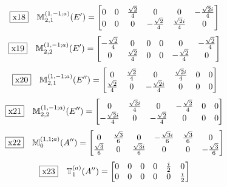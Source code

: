 \documentclass[fleqn,10pt,landscape]{jsarticle}
\begin{document}
\begin{dmath*}
\fbox{x18}\quad \mathbb{M}_{2,1}^{(1,-1;a)}(E^{\prime})=\begin{bmatrix} 0 & 0 & \frac{\sqrt{2}}{4} & 0 & 0 & - \frac{\sqrt{2} i}{4} \\ 0 & 0 & 0 & - \frac{\sqrt{2}}{4} & \frac{\sqrt{2} i}{4} & 0 \end{bmatrix}
\end{dmath*}
\begin{dmath*}
\fbox{x19}\quad \mathbb{M}_{2,2}^{(1,-1;a)}(E^{\prime})=\begin{bmatrix} - \frac{\sqrt{2}}{4} & 0 & 0 & 0 & 0 & - \frac{\sqrt{2}}{4} \\ 0 & \frac{\sqrt{2}}{4} & 0 & 0 & - \frac{\sqrt{2}}{4} & 0 \end{bmatrix}
\end{dmath*}
\begin{dmath*}
\fbox{x20}\quad \mathbb{M}_{2,1}^{(1,-1;a)}(E^{\prime\prime})=\begin{bmatrix} 0 & \frac{\sqrt{2}}{4} & 0 & \frac{\sqrt{2} i}{4} & 0 & 0 \\ \frac{\sqrt{2}}{4} & 0 & - \frac{\sqrt{2} i}{4} & 0 & 0 & 0 \end{bmatrix}
\end{dmath*}
\begin{dmath*}
\fbox{x21}\quad \mathbb{M}_{2,2}^{(1,-1;a)}(E^{\prime\prime})=\begin{bmatrix} 0 & \frac{\sqrt{2} i}{4} & 0 & - \frac{\sqrt{2}}{4} & 0 & 0 \\ - \frac{\sqrt{2} i}{4} & 0 & - \frac{\sqrt{2}}{4} & 0 & 0 & 0 \end{bmatrix}
\end{dmath*}
\begin{dmath*}
\fbox{x22}\quad \mathbb{M}_{0}^{(1,1;a)}(A^{\prime\prime})=\begin{bmatrix} 0 & \frac{\sqrt{3}}{6} & 0 & - \frac{\sqrt{3} i}{6} & \frac{\sqrt{3}}{6} & 0 \\ \frac{\sqrt{3}}{6} & 0 & \frac{\sqrt{3} i}{6} & 0 & 0 & - \frac{\sqrt{3}}{6} \end{bmatrix}
\end{dmath*}
\begin{dmath*}
\fbox{x23}\quad \mathbb{T}_{1}^{(a)}(A^{\prime\prime})=\begin{bmatrix} 0 & 0 & 0 & 0 & \frac{i}{2} & 0 \\ 0 & 0 & 0 & 0 & 0 & \frac{i}{2} \end{bmatrix}
\end{dmath*}
\end{document}
